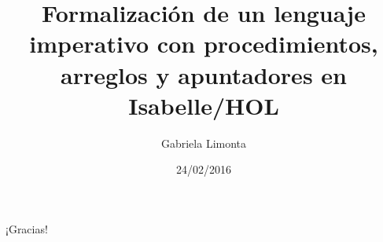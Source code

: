 \documentclass{beamer}
\title[Formalización de un lenguaje imperativo]{Formalización de un lenguaje imperativo con procedimientos, arreglos y apuntadores en Isabelle/HOL}
\author{Gabriela Limonta}
\institute[]{Universidad Simón Bolívar}
\date{24/02/2016}
\newcommand\Fontbi{\fontsize{12}{10}\selectfont}
\begin{document}
\begin{frame}
\titlepage
\end{frame}









\begin{frame}

\Fontbi

\begin{center}
¡Gracias!
\end{center}
\end{frame}
\end{document}
